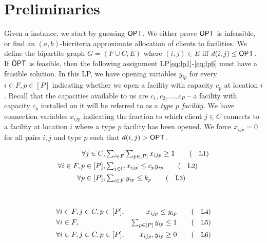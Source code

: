 \section{Preliminaries}\label{sec:prelims}
Given a \mckc instance, we start by guessing $\mathsf{OPT}$. We either prove $\mathsf{OPT}$ is infeasible, or find an $(a,b)$-bicriteria approximate allocation of clients to facilities.
	We define the bipartite graph $G = (F\cup C,E)$ where $(i,j)\in E$ iff $d(i,j) \leq \mathsf{OPT}$. If $\mathsf{OPT}$ is feasible, then the following assignment LP\eqref{eq:lp1}-\eqref{eq:lp6}
	must have a feasible solution.
In this LP, we  have opening  variables $y_{ip}$ for every $i\in F,p\in [P]$ indicating whether we open a facility with capacity $c_p$ at location $i$. Recall that the capacities available to us are $c_1, c_2, \ldots, c_P$ -- a facility with
capacity $c_p$ installed on it will be referred to as a {\em type $p$ facility.}
	We have connection variables $x_{ijp}$ indicating the fraction to which client $j\in C$ connects to a facility at location $i$ where a type $p$ facility has been opened.
	We force $x_{ijp} = 0$ for all pairs $i,j$ and type $p$ such that  $d(i,j) > \mathsf{OPT}$.
	
		
		\begin{minipage}{0.49\textwidth}
			\begin{alignat*}{2}
				 \forall j\in C,   &\textstyle \sum_{i\in F} \sum_{p\in [P]}  x_{ijp} \geq 1 \label{eq:lp1} \tag{\small{L1}}  \\
				 \forall i\in F,p\in [P] ,  &\textstyle \sum_{j\in C}  x_{ijp} \leq c_py_{ip} \label{eq:lp2} \tag{\small{L2}} \\
				 \forall p\in [P], & \textstyle \sum_{i\in F} y_{ip}   \leq k_p \label{eq:lp3}  \tag{\small{L3}}
			\end{alignat*}
		\end{minipage}
		~\vline~
		\begin{minipage}{0.49\textwidth}
			\begin{alignat*}{3}
				&\forall i\in F, j\in C,p\in [P],  & x_{ijp} \leq y_{ip}\label{eq:lp4}   \tag{\small{L4}} \\
				& \forall i\in F, & \textstyle\sum_{p\in [P]} y_{ip} \leq 1 \label{eq:lp5}  \tag{\small{L5}} \\
				& \forall i\in F,j\in C,p\in [P], & x_{ijp},y_{ip} \geq 0\label{eq:lp6}\tag{\small{L6}}
			\end{alignat*}
		\end{minipage}
\smallskip

